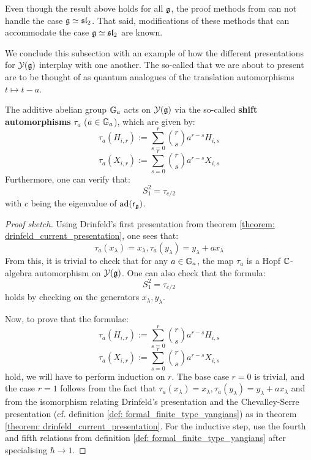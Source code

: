         \begin{remark}
            Even though the result above holds for all $\mathfrak{g}$, the proof methods from \cite[Theorem 4.9]{guay_nakajima_wendlandt_affine_yangian_coproduct} can not handle the case $\mathfrak{g} \simeq \mathfrak{sl}_2$. That said, modifications of these methods that can accommodate the case $\mathfrak{g} \simeq \mathfrak{sl}_2$ are known. 
        \end{remark}

        We conclude this subsection with an example of how the different presentations for $\mathcal{Y}(\mathfrak{g})$ interplay with one another. The so-called  that we are about to present are to be thought of as quantum analogues of the translation automorphisms $t \mapsto t - a$.
        \begin{proposition} \label{prop: finite_type_yangians_shift_automorphisms}
            \cite[Proposition 12.1.5]{chari_pressley_quantum_groups} The additive abelian group $\mathbb{G}_a$ acts on $\mathcal{Y}(\mathfrak{g})$ via the so-called \textbf{shift automorphisms} $\tau_a$ ($a \in \mathbb{G}_a$), which are given by:
                $$\tau_a(H_{i, r}) := \sum_{s = 0}^r \binom{r}{s} a^{r - s} H_{i, s}$$
                $$\tau_a(X_{i, r}) := \sum_{s = 0}^r \binom{r}{s} a^{r - s} X_{i, s}$$
            Furthermore, one can verify that:
                $$S_1^2 = \tau_{c/2}$$
            with $c$ being the eigenvalue of $\mathrm{ad}(\mathsf{r}_{\mathfrak{g}})$.
        \end{proposition}
            \begin{proof}[Proof sketch]
                Using Drinfeld's first presentation from theorem \ref{theorem: drinfeld_current_presentation}, one sees that:
                    $$\tau_a(x_{\lambda}) = x_{\lambda}, \tau_a(y_{\lambda}) = y_{\lambda} + a x_{\lambda}$$
                From this, it is trivial to check that for any $a \in \mathbb{G}_a$, the map $\tau_a$ is a Hopf $\mathbb{C}$-algebra automorphism on $\mathcal{Y}(\mathfrak{g})$. One can also check that the formula:
                    $$S_1^2 = \tau_{c/2}$$
                holds by checking on the generators $x_{\lambda}, y_{\lambda}$. 

                Now, to prove that the formulae:
                    $$\tau_a(H_{i, r}) := \sum_{s = 0}^r \binom{r}{s} a^{r - s} H_{i, s}$$
                    $$\tau_a(X_{i, r}) := \sum_{s = 0}^r \binom{r}{s} a^{r - s} X_{i, s}$$
                hold, we will have to perform induction on $r$. The base case $r = 0$ is trivial, and the case $r = 1$ follows from the fact that $\tau_a(x_{\lambda}) = x_{\lambda}, \tau_a(y_{\lambda}) = y_{\lambda} + a x_{\lambda}$ and from the isomorphism relating Drinfeld's presentation and the Chevalley-Serre presentation (cf. definition \ref{def: formal_finite_type_yangians}) as in theorem \ref{theorem: drinfeld_current_presentation}. For the inductive step, use the fourth and fifth relations from definition \ref{def: formal_finite_type_yangians} after specialising $\hbar \to 1$. 
            \end{proof}

